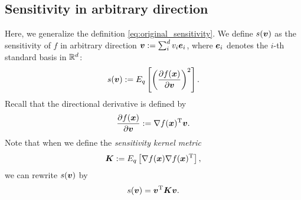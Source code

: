 \subsection{Sensitivity in arbitrary direction}
%
Here, we generalize the definition \eqref{eq:original_sensitivity}.
We define $s(\mbox{\boldmath $v$})$ as the sensitivity of $f$ in arbitrary direction $\mbox{\boldmath $v$} := \sum_{i}^{d} v_i
\mbox{\boldmath $e$}_i$, where $\mbox{\boldmath $e$}_i$ denotes the $i$-th standard basis in $\mathbb{R}^d$:
%
\begin{align}
\begin{split}
 s(\mbox{\boldmath $v$}) := E_q\left[ \left( \frac{\partial f(\mbox{\boldmath $x$})}{\partial \mbox{\boldmath $v$}} \right)^2 \right].
\end{split} \label{eq:koyamada_sensitivity}
\end{align}
%
Recall that the directional derivative is defined by
\begin{align}
\begin{split}
\frac{\partial f(\mbox{\boldmath $x$})}{\partial \mbox{\boldmath $v$}} := \nabla f(\mbox{\boldmath $x$})^{\mathrm{T}} \mbox{\boldmath $v$}.
\end{split}
\end{align}
%
Note that when we define the \textit{sensitivity kernel metric}
%
\begin{align}
\begin{split}
 \mbox{\boldmath $K$}:= E_q \left[
 \nabla f(\mbox{\boldmath $x$}) \nabla f(\mbox{\boldmath $x$})^{\mathrm{T}}
 \right],
\end{split}  \label{eq:koyamada_inner_p}
\end{align}
%
we can rewrite $s(\mbox{\boldmath $v$})$ by
%
\begin{align}
\begin{split}
 s(\mbox{\boldmath $v$}) = \mbox{\boldmath $v$}^{\mathrm{T}} \mbox{\boldmath $K$} \mbox{\boldmath $v$}.
\end{split} \label{eq:koyamada_metric}
\end{align}

